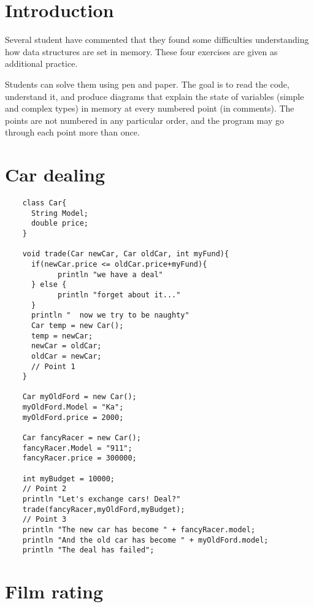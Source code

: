 \documentclass{article}
\begin{document}
\section*{Introduction}
\label{sec:introduction}

Several student have commented that they found some difficulties
understanding how data structures are set in memory. These four
exercises are given as additional practice. 

Students can solve them using pen and paper. The goal is to read
the code, understand it, and produce diagrams that explain the state
of variables (simple and complex types) in memory at every numbered
point (in comments). The points are not numbered in any particular
order, and the program may go through each point more than once. 



\section{Car dealing}
\label{sec:car-dealing}


\begin{verbatim}
    class Car{
      String Model;
      double price;
    }
    
    void trade(Car newCar, Car oldCar, int myFund){
      if(newCar.price <= oldCar.price+myFund){
            println "we have a deal"
      } else {
            println "forget about it..."
      }
      println "  now we try to be naughty"
      Car temp = new Car();
      temp = newCar;
      newCar = oldCar;
      oldCar = newCar;
      // Point 1
    }
    
    Car myOldFord = new Car();
    myOldFord.Model = "Ka";
    myOldFord.price = 2000;
    
    Car fancyRacer = new Car();
    fancyRacer.Model = "911";
    fancyRacer.price = 300000;
    
    int myBudget = 10000;
    // Point 2
    println "Let's exchange cars! Deal?"
    trade(fancyRacer,myOldFord,myBudget);
    // Point 3
    println "The new car has become " + fancyRacer.model;
    println "And the old car has become " + myOldFord.model;
    println "The deal has failed";
\end{verbatim}


\section{Film rating}
\label{sec:film-rating}
\end{document}
